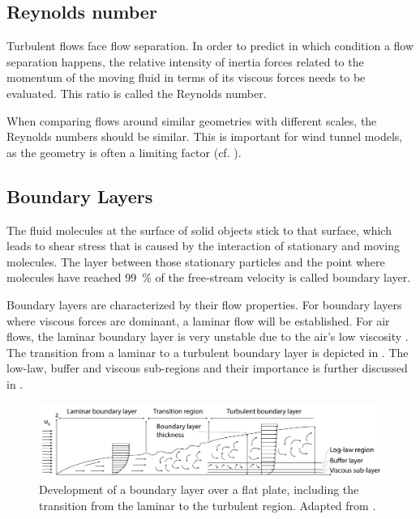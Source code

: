 \subsection{Reynolds number}
\label{sec:reynolds_number}


Turbulent flows face flow separation. 
In order to predict in which condition a flow separation happens, the relative intensity of inertia forces related to the momentum of the moving fluid in terms of its viscous forces needs to be evaluated. This ratio is called the Reynolds number.


When comparing flows around similar geometries with different scales, the Reynolds numbers should be similar. This is important for wind tunnel models, as the geometry is often a limiting factor (cf. ). 

\subsection{Boundary Layers}
\label{sec:theory:boundary-layer}

The fluid molecules at the surface of solid objects stick to that surface, which leads to shear stress that is caused by the interaction of stationary and moving molecules. The layer between those stationary particles and the point where molecules have reached \SI{99}{\percent} of the free-stream velocity is called boundary layer.

Boundary layers are characterized by their flow properties. For boundary layers where viscous forces are dominant, a laminar flow will be established. For air flows, the laminar boundary layer is very unstable due to the air's low viscosity \cite{Aynsley1999}. The transition from a laminar to a turbulent boundary layer is depicted in . The low-law, buffer and viscous sub-regions and their importance is further discussed in  .


\begin{figure}[bht]
	\centering
	\includegraphics[width=1\linewidth]{images/boundary_layer.pdf}
	\captionsetup{format=plain}
	\caption[Development of a boundary layer over a flat plate]{Development of a boundary layer over a flat plate, including the transition from the laminar to the turbulent region. Adapted from \citep{Cengal2006}.}
	\label{fig:boundarylayer}
\end{figure}









